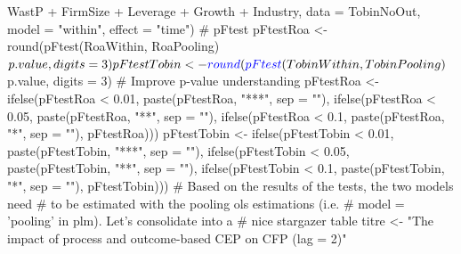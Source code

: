 \documentclass[12pt,]{article}
\newenvironment{Shaded}{}{}
\newcommand{\KeywordTok}[1]{\textcolor[rgb]{0.00,0.00,1.00}{#1}}
\newcommand{\DataTypeTok}[1]{#1}
\newcommand{\DecValTok}[1]{#1}
\newcommand{\FloatTok}[1]{#1}
\newcommand{\StringTok}[1]{\textcolor[rgb]{0.00,0.50,0.50}{#1}}
\newcommand{\CommentTok}[1]{\textcolor[rgb]{0.00,0.50,0.00}{#1}}
\newcommand{\OperatorTok}[1]{#1}
\newcommand{\NormalTok}[1]{#1}
\begin{document}
\begin{Shaded}
\begin{Highlighting}[]
{{{{\StringTok{    }\NormalTok{WastP }\OperatorTok{+}\StringTok{ }\NormalTok{FirmSize }\OperatorTok{+}\StringTok{ }\NormalTok{Leverage }\OperatorTok{+}\StringTok{ }\NormalTok{Growth }\OperatorTok{+}\StringTok{ }\NormalTok{Industry, }\DataTypeTok{data =}\NormalTok{ TobinNoOut, }
    \DataTypeTok{model =} \StringTok{"within"}\NormalTok{, }\DataTypeTok{effect =} \StringTok{"time"}\NormalTok{)}
\CommentTok{# pFtest}
\NormalTok{pFtestRoa <-}\StringTok{ }\KeywordTok{round}\NormalTok{(}\KeywordTok{pFtest}\NormalTok{(RoaWithin, RoaPooling)}\OperatorTok{$}\NormalTok{p.value, }
    \DataTypeTok{digits =} \DecValTok{3}\NormalTok{)}
\NormalTok{pFtestTobin <-}\StringTok{ }\KeywordTok{round}\NormalTok{(}\KeywordTok{pFtest}\NormalTok{(TobinWithin, TobinPooling)}\OperatorTok{$}\NormalTok{p.value, }
    \DataTypeTok{digits =} \DecValTok{3}\NormalTok{)}
\CommentTok{# Improve p-value understanding}
\NormalTok{pFtestRoa <-}\StringTok{ }\KeywordTok{ifelse}\NormalTok{(pFtestRoa }\OperatorTok{<}\StringTok{ }\FloatTok{0.01}\NormalTok{, }\KeywordTok{paste}\NormalTok{(pFtestRoa, }\StringTok{"***"}\NormalTok{, }
    \DataTypeTok{sep =} \StringTok{""}\NormalTok{), }\KeywordTok{ifelse}\NormalTok{(pFtestRoa }\OperatorTok{<}\StringTok{ }\FloatTok{0.05}\NormalTok{, }\KeywordTok{paste}\NormalTok{(pFtestRoa, }
    \StringTok{"**"}\NormalTok{, }\DataTypeTok{sep =} \StringTok{""}\NormalTok{), }\KeywordTok{ifelse}\NormalTok{(pFtestRoa }\OperatorTok{<}\StringTok{ }\FloatTok{0.1}\NormalTok{, }\KeywordTok{paste}\NormalTok{(pFtestRoa, }
    \StringTok{"*"}\NormalTok{, }\DataTypeTok{sep =} \StringTok{""}\NormalTok{), pFtestRoa)))}
\NormalTok{pFtestTobin <-}\StringTok{ }\KeywordTok{ifelse}\NormalTok{(pFtestTobin }\OperatorTok{<}\StringTok{ }\FloatTok{0.01}\NormalTok{, }\KeywordTok{paste}\NormalTok{(pFtestTobin, }
    \StringTok{"***"}\NormalTok{, }\DataTypeTok{sep =} \StringTok{""}\NormalTok{), }\KeywordTok{ifelse}\NormalTok{(pFtestTobin }\OperatorTok{<}\StringTok{ }\FloatTok{0.05}\NormalTok{, }\KeywordTok{paste}\NormalTok{(pFtestTobin, }
    \StringTok{"**"}\NormalTok{, }\DataTypeTok{sep =} \StringTok{""}\NormalTok{), }\KeywordTok{ifelse}\NormalTok{(pFtestTobin }\OperatorTok{<}\StringTok{ }\FloatTok{0.1}\NormalTok{, }\KeywordTok{paste}\NormalTok{(pFtestTobin, }
    \StringTok{"*"}\NormalTok{, }\DataTypeTok{sep =} \StringTok{""}\NormalTok{), pFtestTobin)))}
\CommentTok{# Based on the results of the tests, the two models need}
\CommentTok{# to be estimated with the pooling ols estimations (i.e.}
\CommentTok{# model = 'pooling' in plm). Let's consolidate into a}
\CommentTok{# nice stargazer table}
\NormalTok{titre <-}\StringTok{ "The impact of process and outcome-based CEP on CFP (lag = 2)"}
}}}}
\end{Highlighting}
\end{Shaded}
\end{document}
